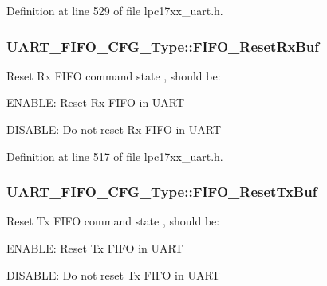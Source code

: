 \-Definition at line 529 of file lpc17xx\-\_\-uart.\-h.

\hypertarget{struct_u_a_r_t___f_i_f_o___c_f_g___type_a716224e98507c50ac54940ebfc51be6f}{
\subsubsection[{\-F\-I\-F\-O\-\_\-\-Reset\-Rx\-Buf}]{ {\bf \-U\-A\-R\-T\-\_\-\-F\-I\-F\-O\-\_\-\-C\-F\-G\-\_\-\-Type\-::\-F\-I\-F\-O\-\_\-\-Reset\-Rx\-Buf}}}\label{struct_u_a_r_t___f_i_f_o___c_f_g___type_a716224e98507c50ac54940ebfc51be6f}
\-Reset \-Rx \-F\-I\-F\-O command state , should be\-:
\begin{DoxyItemize}
\item \-E\-N\-A\-B\-L\-E\-: \-Reset \-Rx \-F\-I\-F\-O in \-U\-A\-R\-T
\item \-D\-I\-S\-A\-B\-L\-E\-: \-Do not reset \-Rx \-F\-I\-F\-O in \-U\-A\-R\-T 
\end{DoxyItemize}

\-Definition at line 517 of file lpc17xx\-\_\-uart.\-h.

\hypertarget{struct_u_a_r_t___f_i_f_o___c_f_g___type_a21d70658d3e3b61667dd3bc27a7817f2}{
\subsubsection[{\-F\-I\-F\-O\-\_\-\-Reset\-Tx\-Buf}]{ {\bf \-U\-A\-R\-T\-\_\-\-F\-I\-F\-O\-\_\-\-C\-F\-G\-\_\-\-Type\-::\-F\-I\-F\-O\-\_\-\-Reset\-Tx\-Buf}}}\label{struct_u_a_r_t___f_i_f_o___c_f_g___type_a21d70658d3e3b61667dd3bc27a7817f2}
\-Reset \-Tx \-F\-I\-F\-O command state , should be\-:
\begin{DoxyItemize}
\item \-E\-N\-A\-B\-L\-E\-: \-Reset \-Tx \-F\-I\-F\-O in \-U\-A\-R\-T
\item \-D\-I\-S\-A\-B\-L\-E\-: \-Do not reset \-Tx \-F\-I\-F\-O in \-U\-A\-R\-T 
\end{DoxyItemize}

